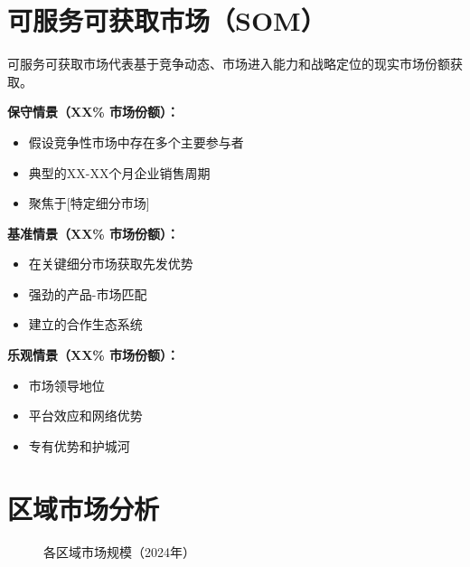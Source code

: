 \documentclass[11pt,letterpaper]{report}
\begin{document}
{\section{可服务可获取市场（SOM）}

可服务可获取市场代表基于竞争动态、市场进入能力和战略定位的现实市场份额获取。

\begin{keyinsightbox}[SOM预测（2034年）]
\textbf{保守情景（XX\% 市场份额）：} 
\begin{itemize}
    \item 假设竞争性市场中存在多个主要参与者
    \item 典型的XX-XX个月企业销售周期
    \item 聚焦于[特定细分市场]
\end{itemize}

\textbf{基准情景（XX\% 市场份额）：} 
\begin{itemize}
    \item 在关键细分市场获取先发优势
    \item 强劲的产品-市场匹配
    \item 建立的合作生态系统
\end{itemize}

\textbf{乐观情景（XX\% 市场份额）：} 
\begin{itemize}
    \item 市场领导地位
    \item 平台效应和网络优势
    \item 专有优势和护城河
\end{itemize}
\end{keyinsightbox}

\section{区域市场分析}


\begin{figure}[htbp]
\centering
\caption{各区域市场规模（2024年）}
\label{fig:regional_breakdown}
\end{figure}

}
\end{document}
